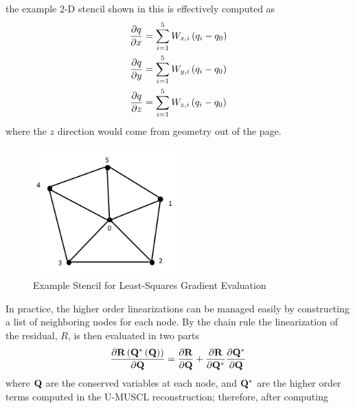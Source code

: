 the example 2-D stencil shown in  this is effectively
computed as
\begin{equation}
  \begin{aligned}
    \frac{\partial q}{\partial x} &= \sum_{i=1}^{5}{W_{x,i}\left( q_i - q_0 \right)} \\
    \frac{\partial q}{\partial y} &= \sum_{i=1}^{5}{W_{y,i}\left( q_i - q_0 \right)} \\
    \frac{\partial q}{\partial z} &= \sum_{i=1}^{5}{W_{z,i}\left( q_i - q_0 \right)}
  \end{aligned}
  \label{grad-construction}
\end{equation}
where the $z$ direction would come from geometry out of the page.
\begin{figure}[h]
  \centering
  \includegraphics[width=0.5\textwidth]{figures/stencil.png}
  \caption{Example Stencil for Least-Squares Gradient Evaluation}
  \label{fig:lsq-gradients}
\end{figure}
In practice, the higher order linearizations can be managed easily by
constructing a list of neighboring nodes for each node.  By the chain rule the
linearization of the residual, $R$, is then evaluated in two parts
\begin{equation}
  \frac{\partial \mathbf R\left(\mathbf Q^*\left( \mathbf Q \right) \right)}{\partial \mathbf Q} = 
  \frac{\partial \mathbf R}{\partial \mathbf Q} + \frac{\partial \mathbf R}{\partial \mathbf Q^{*}}\frac{\partial \mathbf Q^*}{\partial \mathbf Q}
  \label{residual-high-low}
\end{equation}
where $\mathbf Q$ are the conserved variables at each node, and $\mathbf Q^*$ are the higher
order terms computed in the U-MUSCL reconstruction; therefore, after computing
